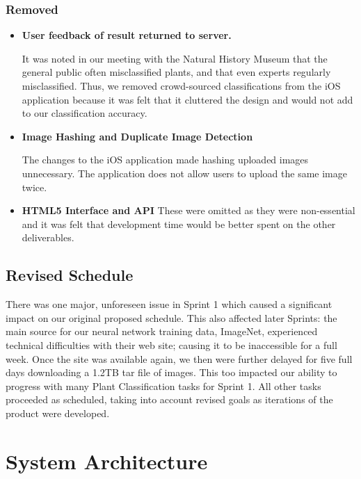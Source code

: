 \documentclass[a4paper,11pt]{article}
\begin{document}
\subsubsection{Removed}

\begin{itemize}
\item \textbf{User feedback of result returned to server.}
  
  It was noted in our meeting with the Natural History Museum that the general public often misclassified plants, and that even experts regularly misclassified. Thus, we removed crowd-sourced classifications from the iOS application because it was felt that it cluttered the design and would not add to our classification accuracy. 
  
     \item \textbf{Image Hashing and Duplicate Image Detection}
   
   The changes to the iOS application made hashing uploaded images unnecessary. The application does not allow users to upload the same image twice.
   
   \item \textbf{HTML5 Interface and API}
   These were omitted as they were non-essential and it was felt that development time would be better spent on the other deliverables.
  
\end{itemize}
     


\subsection{Revised Schedule}

There was one major, unforeseen issue in Sprint 1 which caused a significant impact on our original proposed schedule. This also affected later Sprints: the main source for our neural network training data, ImageNet, experienced technical difficulties with their web site; causing it to be inaccessible for a full week. Once the site was available again, we then were further delayed for five full days downloading a 1.2TB tar file of images. This too impacted our ability to progress with many Plant Classification tasks for Sprint 1. All other tasks proceeded as scheduled, taking into account revised goals as iterations of the product were developed.


\clearpage

\section{System Architecture}
\end{document}
